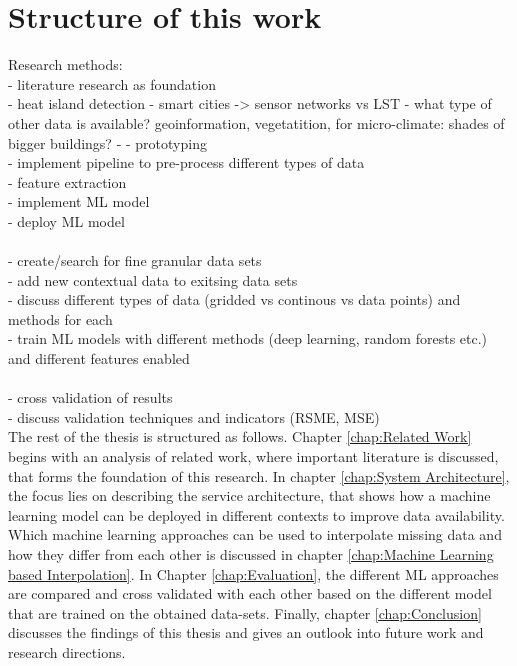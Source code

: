 \section{Structure of this work}

Research methods:\\
- literature research as foundation\\
    - heat island detection
        - smart cities -> sensor networks vs LST
        - what type of other data is available? geoinformation, vegetatition, for micro-climate: shades of bigger buildings?
    - 
- prototyping\\
    - implement pipeline to pre-process different types of data\\
    - feature extraction\\
    - implement ML model\\
    - deploy ML model\\
\\
- create/search for fine granular data sets\\
    - add new contextual data to exitsing data sets\\
    - discuss different types of data (gridded vs continous vs data points) and methods for each
\\
- train ML models with different methods (deep learning, random forests etc.) and different features enabled\\
\\
- cross validation of results\\
    - discuss validation techniques and indicators (RSME, MSE)\\


The rest of the thesis is structured as follows. Chapter \ref{chap:Related Work} begins with an analysis of related work, where important literature is discussed, that forms the foundation of this research. In chapter \ref{chap:System Architecture}, the focus lies on describing the service architecture, that shows how a machine learning model can be deployed in different contexts to improve data availability. Which machine learning approaches can be used to interpolate missing data and how they differ from each other is discussed in chapter \ref{chap:Machine Learning based Interpolation}. In Chapter \ref{chap:Evaluation}, the different ML approaches are compared and cross validated with each other based on the different model that are trained on the obtained data-sets. Finally, chapter \ref{chap:Conclusion} discusses the findings of this thesis and gives an outlook into future work and research directions.
